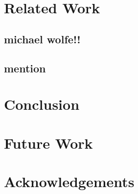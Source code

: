 \documentclass[11pt, twocolumn]{article}
\begin{document}
\section{Related Work} %
    \subsection{michael wolfe!!}
    \subsection{mention} %

\section{Conclusion} %

\section{Future Work} %
\section{Acknowledgements} %
\end{document}
